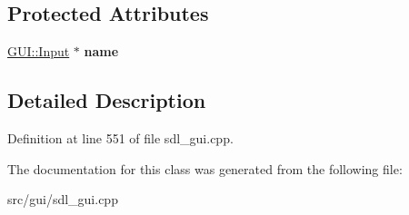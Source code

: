 \subsection*{Protected Attributes}
\begin{DoxyCompactItemize}
\item 
\hypertarget{classSaveDialog_a112cebb10bd8304b2eaf491beded0abb}{\hyperlink{classGUI_1_1Input}{G\-U\-I\-::\-Input} $\ast$ {\bfseries name}}\label{classSaveDialog_a112cebb10bd8304b2eaf491beded0abb}

\end{DoxyCompactItemize}


\subsection{Detailed Description}


Definition at line 551 of file sdl\-\_\-gui.\-cpp.



The documentation for this class was generated from the following file\-:\begin{DoxyCompactItemize}
\item 
src/gui/sdl\-\_\-gui.\-cpp\end{DoxyCompactItemize}
